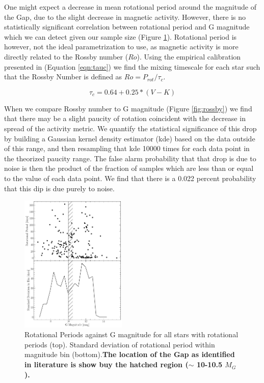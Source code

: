 

One might expect a decrease in mean rotational period around the magnitude of
the Gap, due to the slight decrease in magnetic activity. However, there is no
statistically significant correlation between rotational period and G
magnitude which we can detect given our sample size (Figure
\ref{fig:rotationalSignifigance}). Rotational period is however, not the ideal
parametrization to use, as magnetic activity is more directly related to the
Rossby number ($Ro$). Using the empirical calibration presented in
\citet{Wright2018} (Equation \ref{eqn:tauc}) we find the mixing timescale for
each star such that the Rossby Number is defined as $Ro = P_{rot}/\tau_{c}$.

\begin{equation}\label{eqn:tauc}
  \tau_{c} = 0.64 + 0.25 * (V-K)
\end{equation}

When we compare Rossby number to G magnitude (Figure \ref{fig:rossby}) we find
that there may be a slight paucity of rotation coincident with the decrease in
spread of the activity metric. We quantify the statistical significance of this
drop by building a Gaussian kernel density estimator (kde) based on the data
outside of this range, and then resampling that kde 10000 times for each data
point in the theorized paucity range. The false alarm probability that that drop
is due to noise is then the product of the fraction of samples which are less
than or equal to the value of each data point. We find that there is a 0.022
percent probability that this dip is due purely to noise.


\begin{figure}
  \centering
  \includegraphics[width=0.45\textwidth]{figures/RotationSignifigance.pdf}
  \caption{Rotational Periods against G magnitude for all stars with rotational
  periods (top). Standard deviation of rotational period within magnitude bin (bottom).\textbf{The location of the Gap
  as identified in literature is show buy the hatched region ($\sim$ 10-10.5 $M_{G}$).}}
  \label{fig:rotationalSignifigance}
\end{figure}

